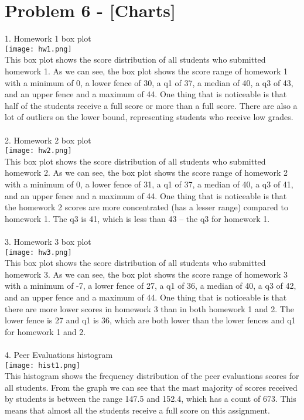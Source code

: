 \documentclass[9pt,twoside]{exam}
\begin{document}
\section*{Problem 6 -  [Charts]}
1. Homework 1 box plot \\
\texttt{[image: hw1.png]}\\
This box plot shows the score distribution of all students who submitted homework 1. As we can see, the box plot shows the score range of homework 1 with a minimum of 0, a lower fence of 30, a q1 of 37, a median of 40, a q3 of 43, and an upper fence and a maximum of 44. One thing that is noticeable is that half of the students receive a full score or more than a full score. There are also a lot of outliers on the lower bound, representing students who receive low grades. \\\\
2. Homework 2 box plot \\
\texttt{[image: hw2.png]}\\
This box plot shows the score distribution of all students who submitted homework 2. As we can see, the box plot shows the score range of homework 2 with a minimum of 0, a lower fence of 31, a q1 of 37, a median of 40, a q3 of 41, and an upper fence and a maximum of 44. One thing that is noticeable is that the homework 2 scores are more concentrated (has a lesser range) compared to homework 1. The q3 is 41, which is less than 43 -- the q3 for homework 1. \\\\
3. Homework 3 box plot \\
\texttt{[image: hw3.png]}\\
This box plot shows the score distribution of all students who submitted homework 3. As we can see, the box plot shows the score range of homework 3 with a minimum of -7, a lower fence of 27, a q1 of 36, a median of 40, a q3 of 42, and an upper fence and a maximum of 44. One thing that is noticeable is that there are more lower scores in 
 homework 3 than in both homework 1 and 2. The lower fence is 27 and q1 is 36, which are both lower than the lower fences and q1 for homework 1 and 2. \\\\
4. Peer Evaluations histogram  \\
\texttt{[image: hist1.png]}\\
This histogram shows the frequency distribution of the peer evaluations scores for all students. From the graph we can see that the mast majority of scores received by students is between the range 147.5 and 152.4, which has a count of 673. This means that almost all the students receive a full score on this assignment.\\\\
\end{document}
